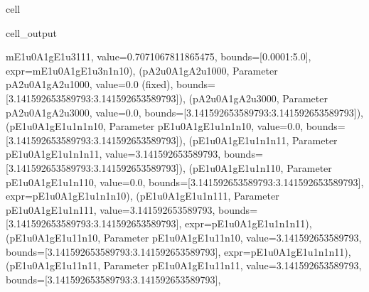 \documentclass[letterpaper,table,10pt,english]{jupyterBook}
\begin{document}
\begin{sphinxuseclass}{cell}
\begin{sphinxVerbatimOutput}
\begin{sphinxuseclass}{cell_output}
\begin{sphinxVerbatim}[commandchars=\\\{\}]
\PYGZsq{}m\PYGZus{}E1u\PYGZus{}0\PYGZus{}A1g\PYGZus{}E1u\PYGZus{}3\PYGZus{}1\PYGZus{}1\PYGZus{}1\PYGZsq{}, value=0.7071067811865475, bounds=[0.0001:5.0], expr=\PYGZsq{}m\PYGZus{}E1u\PYGZus{}0\PYGZus{}A1g\PYGZus{}E1u\PYGZus{}3\PYGZus{}n1\PYGZus{}n1\PYGZus{}0\PYGZsq{}\PYGZgt{}), (\PYGZsq{}p\PYGZus{}A2u\PYGZus{}0\PYGZus{}A1g\PYGZus{}A2u\PYGZus{}1\PYGZus{}0\PYGZus{}0\PYGZus{}0\PYGZsq{}, \PYGZlt{}Parameter \PYGZsq{}p\PYGZus{}A2u\PYGZus{}0\PYGZus{}A1g\PYGZus{}A2u\PYGZus{}1\PYGZus{}0\PYGZus{}0\PYGZus{}0\PYGZsq{}, value=0.0 (fixed), bounds=[\PYGZhy{}3.141592653589793:3.141592653589793]\PYGZgt{}), (\PYGZsq{}p\PYGZus{}A2u\PYGZus{}0\PYGZus{}A1g\PYGZus{}A2u\PYGZus{}3\PYGZus{}0\PYGZus{}0\PYGZus{}0\PYGZsq{}, \PYGZlt{}Parameter \PYGZsq{}p\PYGZus{}A2u\PYGZus{}0\PYGZus{}A1g\PYGZus{}A2u\PYGZus{}3\PYGZus{}0\PYGZus{}0\PYGZus{}0\PYGZsq{}, value=0.0, bounds=[\PYGZhy{}3.141592653589793:3.141592653589793]\PYGZgt{}), (\PYGZsq{}p\PYGZus{}E1u\PYGZus{}0\PYGZus{}A1g\PYGZus{}E1u\PYGZus{}1\PYGZus{}n1\PYGZus{}n1\PYGZus{}0\PYGZsq{}, \PYGZlt{}Parameter \PYGZsq{}p\PYGZus{}E1u\PYGZus{}0\PYGZus{}A1g\PYGZus{}E1u\PYGZus{}1\PYGZus{}n1\PYGZus{}n1\PYGZus{}0\PYGZsq{}, value=0.0, bounds=[\PYGZhy{}3.141592653589793:3.141592653589793]\PYGZgt{}), (\PYGZsq{}p\PYGZus{}E1u\PYGZus{}0\PYGZus{}A1g\PYGZus{}E1u\PYGZus{}1\PYGZus{}n1\PYGZus{}n1\PYGZus{}1\PYGZsq{}, \PYGZlt{}Parameter \PYGZsq{}p\PYGZus{}E1u\PYGZus{}0\PYGZus{}A1g\PYGZus{}E1u\PYGZus{}1\PYGZus{}n1\PYGZus{}n1\PYGZus{}1\PYGZsq{}, value=3.141592653589793, bounds=[\PYGZhy{}3.141592653589793:3.141592653589793]\PYGZgt{}), (\PYGZsq{}p\PYGZus{}E1u\PYGZus{}0\PYGZus{}A1g\PYGZus{}E1u\PYGZus{}1\PYGZus{}n1\PYGZus{}1\PYGZus{}0\PYGZsq{}, \PYGZlt{}Parameter \PYGZsq{}p\PYGZus{}E1u\PYGZus{}0\PYGZus{}A1g\PYGZus{}E1u\PYGZus{}1\PYGZus{}n1\PYGZus{}1\PYGZus{}0\PYGZsq{}, value=0.0, bounds=[\PYGZhy{}3.141592653589793:3.141592653589793], expr=\PYGZsq{}p\PYGZus{}E1u\PYGZus{}0\PYGZus{}A1g\PYGZus{}E1u\PYGZus{}1\PYGZus{}n1\PYGZus{}n1\PYGZus{}0\PYGZsq{}\PYGZgt{}), (\PYGZsq{}p\PYGZus{}E1u\PYGZus{}0\PYGZus{}A1g\PYGZus{}E1u\PYGZus{}1\PYGZus{}n1\PYGZus{}1\PYGZus{}1\PYGZsq{}, \PYGZlt{}Parameter \PYGZsq{}p\PYGZus{}E1u\PYGZus{}0\PYGZus{}A1g\PYGZus{}E1u\PYGZus{}1\PYGZus{}n1\PYGZus{}1\PYGZus{}1\PYGZsq{}, value=3.141592653589793, bounds=[\PYGZhy{}3.141592653589793:3.141592653589793], expr=\PYGZsq{}p\PYGZus{}E1u\PYGZus{}0\PYGZus{}A1g\PYGZus{}E1u\PYGZus{}1\PYGZus{}n1\PYGZus{}n1\PYGZus{}1\PYGZsq{}\PYGZgt{}), (\PYGZsq{}p\PYGZus{}E1u\PYGZus{}0\PYGZus{}A1g\PYGZus{}E1u\PYGZus{}1\PYGZus{}1\PYGZus{}n1\PYGZus{}0\PYGZsq{}, \PYGZlt{}Parameter \PYGZsq{}p\PYGZus{}E1u\PYGZus{}0\PYGZus{}A1g\PYGZus{}E1u\PYGZus{}1\PYGZus{}1\PYGZus{}n1\PYGZus{}0\PYGZsq{}, value=3.141592653589793, bounds=[\PYGZhy{}3.141592653589793:3.141592653589793], expr=\PYGZsq{}p\PYGZus{}E1u\PYGZus{}0\PYGZus{}A1g\PYGZus{}E1u\PYGZus{}1\PYGZus{}n1\PYGZus{}n1\PYGZus{}1\PYGZsq{}\PYGZgt{}), (\PYGZsq{}p\PYGZus{}E1u\PYGZus{}0\PYGZus{}A1g\PYGZus{}E1u\PYGZus{}1\PYGZus{}1\PYGZus{}n1\PYGZus{}1\PYGZsq{}, \PYGZlt{}Parameter \PYGZsq{}p\PYGZus{}E1u\PYGZus{}0\PYGZus{}A1g\PYGZus{}E1u\PYGZus{}1\PYGZus{}1\PYGZus{}n1\PYGZus{}1\PYGZsq{}, value=3.141592653589793, bounds=[\PYGZhy{}3.141592653589793:3.141592653589793], 
\end{sphinxVerbatim}
\end{sphinxuseclass}
\end{sphinxVerbatimOutput}
\end{sphinxuseclass}
\end{document}
